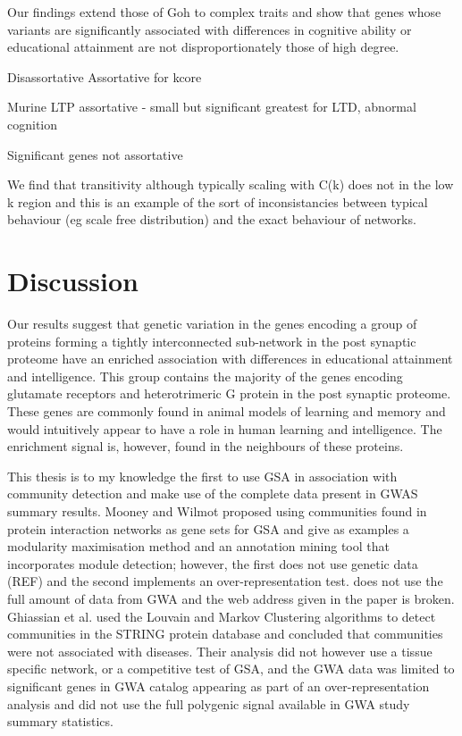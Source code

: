 	Our findings extend those of Goh to complex traits and show that genes whose variants are significantly associated with differences in cognitive ability or educational attainment are not disproportionately those of high degree\cite{goh2007human}. 
 	
 	
 	
 	Disassortative
 	Assortative for kcore
 	
 	Murine LTP assortative - small but significant greatest for LTD, abnormal cognition
 	
 	Significant genes not assortative
 	
 	
 	We find that transitivity although typically scaling with C(k) does not in the low k region and this is an example of the sort of inconsistancies between typical behaviour (eg scale free distribution) and the exact behaviour of networks. 
 	
\section{Discussion}
Our results suggest that genetic variation in the genes encoding a group of proteins forming a tightly interconnected sub-network in the post synaptic proteome have an enriched association with differences in educational attainment and intelligence. This group contains the majority of the genes encoding glutamate receptors and heterotrimeric G protein in the post synaptic proteome. These genes are commonly found in animal models of learning and memory and would intuitively appear to have a role in human learning and intelligence. The enrichment signal is, however, found in the neighbours of these proteins.

This thesis is to my knowledge the first to use GSA in association with community detection and make use of the complete data present in GWAS summary results. Mooney and Wilmot proposed using communities found in protein interaction networks as gene sets for GSA\cite{mooney2015gene} and give as examples a modularity maximisation method and an annotation mining tool that incorporates module detection; however, the first does not use genetic data (REF) and the second implements an over-representation test. does not use the full amount of data from GWA and the web address given in the paper is broken. Ghiassian et al. used the Louvain and Markov Clustering algorithms to detect communities in the STRING protein database and concluded that communities were not associated with diseases. Their analysis did not however use a tissue specific network, or a competitive test of GSA, and the GWA data was limited to significant genes in GWA catalog\cite{ghiassian2015disease} appearing as part of an over-representation analysis and did not use the full polygenic signal available in GWA study summary statistics. 

